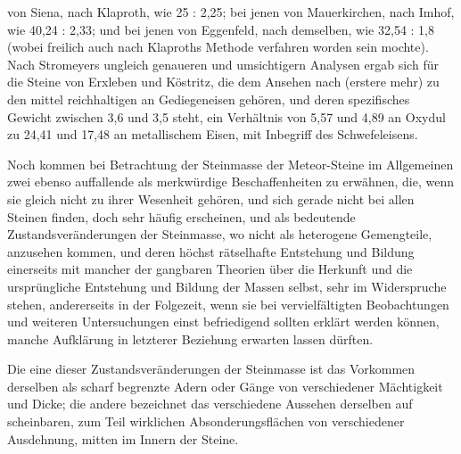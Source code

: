\documentclass[a4paper, 11pt, oneside, german]{article}
\begin{document}
von Siena, nach Klaproth, wie 25 : 2,25; bei jenen von Mauerkirchen, nach Imhof, wie 40,24 : 2,33; und bei jenen von Eggenfeld, nach demselben, wie 32,54 : 1,8 (wobei freilich auch nach Klaproths Methode verfahren worden sein mochte). Nach Stromeyers ungleich genaueren und umsichtigern Analysen ergab sich für die Steine von Erxleben und Köstritz, die dem Ansehen nach (erstere mehr) zu den mittel reichhaltigen an Gediegeneisen gehören, und deren spezifisches Gewicht zwischen 3,6 und 3,5 steht, ein Verhältnis von 5,57 und 4,89 an Oxydul zu 24,41 und 17,48 an metallischem Eisen, mit Inbegriff des Schwefeleisens.

Noch kommen bei Betrachtung der Steinmasse der Meteor-Steine im Allgemeinen zwei ebenso auffallende als merkwürdige Beschaffenheiten zu erwähnen, die, wenn sie gleich nicht zu ihrer Wesenheit gehören, und sich gerade nicht bei allen Steinen finden, doch sehr häufig erscheinen, und als bedeutende Zustandsveränderungen der Steinmasse, wo nicht als heterogene Gemengteile, anzusehen kommen, und deren höchst rätselhafte Entstehung und Bildung einerseits mit mancher der gangbaren Theorien über die Herkunft und die ursprüngliche Entstehung und Bildung der Massen selbst, sehr im Widerspruche stehen, andererseits in der Folgezeit, wenn sie bei vervielfältigten Beobachtungen und weiteren Untersuchungen einst befriedigend sollten erklärt werden können, manche Aufklärung in letzterer Beziehung erwarten lassen dürften.

Die eine dieser Zustandsveränderungen der Steinmasse ist das Vorkommen derselben als scharf begrenzte Adern oder Gänge von verschiedener Mächtigkeit und Dicke; die andere bezeichnet das verschiedene Aussehen derselben auf scheinbaren, zum Teil wirklichen Absonderungsflächen von verschiedener Ausdehnung, mitten im Innern der Steine.
\end{document}
